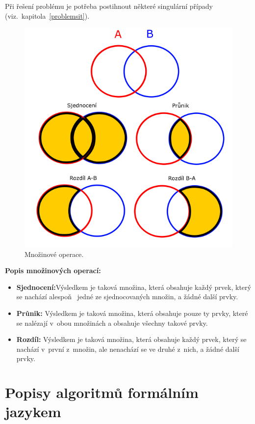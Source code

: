 \documentclass[a4paper, 12pt, oneside, titlepage]{article} %
\begin{document}
Při řešení problému je potřeba postihnout některé singulární případy (viz.~kapitola~\ref{problemsit}).

\begin{figure}[!htb]
	\centering
	\includegraphics[scale=0.6]{obrazky/mn_operace.png} 
	\caption{Množinové operace.
	}
	\label{fig:mn_operace}
\end{figure} 
\FloatBarrier

\textbf{Popis množinových operací:}
\begin{itemize}
\item \textbf{Sjednocení:}Výsledkem je taková množina, která obsahuje každý prvek, který se nachází alespoň ~jedné ze sjednocovaných množin, a žádné další prvky.
\item \textbf{Průnik:} Výsledkem je taková množina, která obsahuje pouze ty prvky, které se nalézají v~obou množinách a obsahuje všechny takové prvky.
\item \textbf{Rozdíl:} Výsledkem je taková množina, která obsahuje každý prvek, který se nachází v~první z~množin, ale nenachází se ve druhé z~nich, a žádné další prvky. 

\end{itemize}

\section{Popisy algoritmů formálním jazykem} \label{popisalg}
\end{document}
